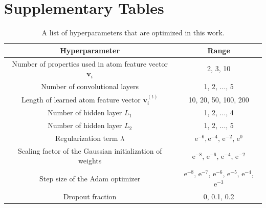 \documentclass[twocolumn, prl]{revtex4-1}
\newcommand{\me}{\mathrm{e}}
\begin{document}
\clearpage

\section{Supplementary Tables}


\begin{table}[htb]%
\caption{A list of hyperparameters that are optimized in this work. }
\begin{ruledtabular}
\begin{tabular}{cc}
  Hyperparameter                                  & Range		\\
  \hline
  Number of properties used in atom feature vector $\bm{v}_i$ & 2, 3, 10\\
  Number of convolutional layers                  & 1, 2, ..., 5    	\\
  Length of learned atom feature vector $\bm{v}_i^{(t)}$  & 10, 20, 50, 100, 200 \\
  Number of hidden layer $L_1$\footnotemark[1]    & 1, 2, ..., 4 \\
  Number of hidden layer $L_2$\footnotemark[1]    & 1, 2, ..., 5 \\
  Regularization term $\lambda$\footnotemark[2]   & $\me^{-6}, \me^{-4}$, $\me^{-2}$, $\me^{0}$ \\
  Scaling factor of the Gaussian initialization of weights  & $\me^{-8}$, $\me^{-6}$, $\me^{-4}$, $\me^{-2}$ \\
  Step size of the Adam optimizer\cite{kingma2014adam}  &  $\me^{-8}$, $\me^{-7}$, $\me^{-6}$, $\me^{-5}$, $\me^{-4}$, $\me^{-3}$ \\
  Dropout fraction\cite{srivastava2014dropout}   & 0, 0.1, 0.2 \\



\end{tabular}
\end{ruledtabular}
\label{tab:list-of-hyper}
\end{table}
\end{document}
